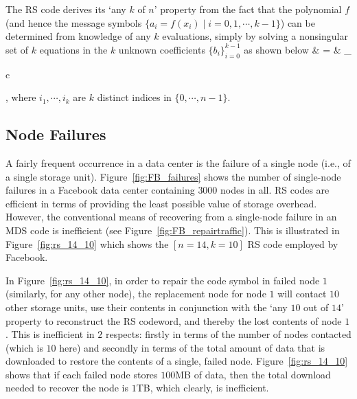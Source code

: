\begin{multicols}{2}
	The RS code derives its `any $k$ of $n$' property from the fact that the polynomial $f$ (and hence the message symbols $\{a_i =f(x_i) \mid i=0,1,\cdots,k-1\}$) can be determined from knowledge of any $k$ evaluations, simply by solving a nonsingular set of $k$ equations in the $k$ unknown coefficients $\{b_i\}_{i=0}^{k-1}$ as shown below
		\bean
		 & = & 
		_{\begin{array}{c}  \\  \end{array} }
		,
		\eean
	where $i_1, \cdots, i_k$ are $k$ distinct indices in $\{0, \cdots, n-1\}$.

	\subsection{Node Failures} 
		
	A fairly frequent occurrence in a data center is the failure of a single node (i.e., of a single storage unit). Figure~\ref{fig:FB_failures} shows the number of single-node failures in a Facebook data center containing $3000$ nodes in all. RS codes are efficient in terms of providing the least possible value of storage overhead.  However, the conventional means of recovering from a single-node failure in an MDS code is inefficient (see Figure~\ref{fig:FB_repairtraffic}). This is illustrated in Figure~\ref{fig:rs_14_10} which shows the $[n=14,k=10]$ RS code employed by Facebook. 

	In Figure~\ref{fig:rs_14_10}, in order to repair the code symbol in failed node $1$ (similarly, for any other node), the replacement node for node $1$ will contact $10$ other storage units, use their contents in conjunction with the `any $10$ out of $14$' property to reconstruct the RS codeword, and thereby the lost contents of node $1$.  This is inefficient in $2$ respects: firstly in terms of the number of nodes contacted (which is $10$  here) and secondly in terms of the total amount of data that is downloaded to restore the contents of a single, failed node. Figure~\ref{fig:rs_14_10} shows that if each failed node stores $100$MB of data, then the total download needed to recover the node is $1$TB, which clearly, is inefficient.


\end{multicols}
